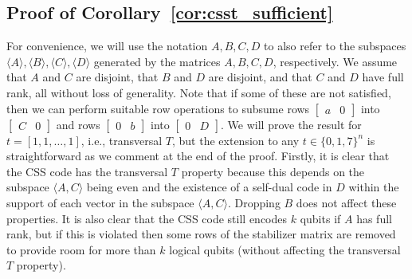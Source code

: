 \documentclass[twoside,romanappendices]{IEEEtran}
\begin{document}
\subsection{Proof of Corollary~\ref{cor:csst_sufficient}}
\label{sec:proof_csst_sufficient}


For convenience, we will use the notation $A,B,C,D$ to also refer to the subspaces $\langle A \rangle, \langle B \rangle, \langle C \rangle, \langle D \rangle$ generated by the matrices $A,B,C,D$, respectively.
We assume that $A$ and $C$ are disjoint, that $B$ and $D$ are disjoint, and that $C$ and $D$ have full rank, all without loss of generality.
Note that if some of these are not satisfied, then we can perform suitable row operations to subsume rows $\begin{bmatrix} a & 0 \end{bmatrix}$ into $\begin{bmatrix} C & 0 \end{bmatrix}$ and rows $\begin{bmatrix} 0 & b \end{bmatrix}$ into $\begin{bmatrix} 0 & D \end{bmatrix}$.
We will prove the result for $t = [1,1,\ldots,1]$, i.e., transversal $T$, but the extension to any $t \in \{0,1,7\}^n$ is straightforward as we comment at the end of the proof.
Firstly, it is clear that the CSS code has the transversal $T$ property because this depends on the subspace $\langle A,C \rangle$ being even and the existence of a self-dual code in $D$ within the support of each vector in the subspace $\langle A,C \rangle$. 
Dropping $B$ does not affect these properties. 
It is also clear that the CSS code still encodes $k$ qubits if $A$ has full rank, but if this is violated then some rows of the stabilizer matrix are removed to provide room for more than $k$ logical qubits (without affecting the transversal $T$ property).
\end{document}
